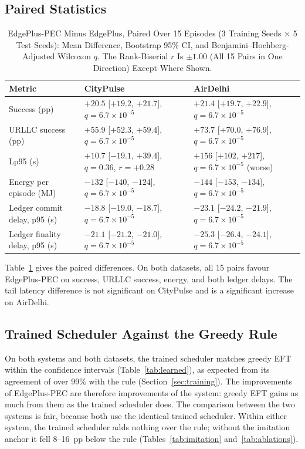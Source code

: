 \documentclass[11pt,journal,onecolumn]{IEEEtran}
\begin{document}
\subsection{Paired Statistics}
\begin{table}[!t]
\centering
\caption{EdgePlus-PEC Minus EdgePlus, Paired Over 15 Episodes (3 Training Seeds $\times$ 5 Test Seeds): Mean Difference, Bootstrap 95\% CI, and Benjamini--Hochberg-Adjusted Wilcoxon $q$. The Rank-Biserial $r$ Is $\pm1.00$ (All 15 Pairs in One Direction) Except Where Shown.}
\label{tab:paired}
\footnotesize
\begin{tabular}{lll}
\toprule
Metric & CityPulse & AirDelhi\\
\midrule
Success (pp) & $+20.5$ [$+19.2$, $+21.7$], $q = 6.7\times10^{-5}$ & $+21.4$ [$+19.7$, $+22.9$], $q = 6.7\times10^{-5}$\\
URLLC success (pp) & $+55.9$ [$+52.3$, $+59.4$], $q = 6.7\times10^{-5}$ & $+73.7$ [$+70.0$, $+76.9$], $q = 6.7\times10^{-5}$\\
Lp95 (s) & $+10.7$ [$-19.1$, $+39.4$], $q = 0.36$, $r = +0.28$ & $+156$ [$+102$, $+217$], $q = 6.7\times10^{-5}$ (worse)\\
Energy per episode (MJ) & $-132$ [$-140$, $-124$], $q = 6.7\times10^{-5}$ & $-144$ [$-153$, $-134$], $q = 6.7\times10^{-5}$\\
Ledger commit delay, p95 (s) & $-18.8$ [$-19.0$, $-18.7$], $q = 6.7\times10^{-5}$ & $-23.1$ [$-24.2$, $-21.9$], $q = 6.7\times10^{-5}$\\
Ledger finality delay, p95 (s) & $-21.1$ [$-21.2$, $-21.0$], $q = 6.7\times10^{-5}$ & $-25.3$ [$-26.4$, $-24.1$], $q = 6.7\times10^{-5}$\\
\bottomrule
\end{tabular}
\end{table}

Table~\ref{tab:paired} gives the paired differences. On both datasets, all 15 pairs favour EdgePlus-PEC on success, URLLC success, energy, and both ledger delays. The tail latency difference is not significant on CityPulse and is a significant increase on AirDelhi.

\subsection{Trained Scheduler Against the Greedy Rule}
\label{sec:res-learn}
On both systems and both datasets, the trained scheduler matches greedy EFT within the confidence intervals (Table~\ref{tab:learned}), as expected from its agreement of over 99\% with the rule (Section~\ref{sec:training}). The improvements of EdgePlus-PEC are therefore improvements of the system: greedy EFT gains as much from them as the trained scheduler does. The comparison between the two systems is fair, because both use the identical trained scheduler. Within either system, the trained scheduler adds nothing over the rule; without the imitation anchor it fell 8--16~pp below the rule (Tables~\ref{tab:imitation} and~\ref{tab:ablations}).
\end{document}
